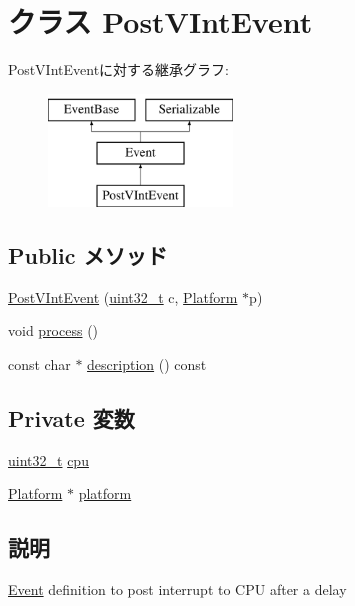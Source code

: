 \hypertarget{classVGic_1_1PostVIntEvent}{
\section{クラス PostVIntEvent}
\label{classVGic_1_1PostVIntEvent}
}
PostVIntEventに対する継承グラフ:\begin{figure}[H]
\begin{center}
\leavevmode
\includegraphics[height=3cm]{classVGic_1_1PostVIntEvent}
\end{center}
\end{figure}
\subsection*{Public メソッド}
\begin{DoxyCompactItemize}
\item 
\hyperlink{classVGic_1_1PostVIntEvent_a570dbdb580e7d62ba8a6ffcedad55aac}{PostVIntEvent} (\hyperlink{Type_8hh_a435d1572bf3f880d55459d9805097f62}{uint32\_\-t} c, \hyperlink{classPlatform}{Platform} $\ast$p)
\item 
void \hyperlink{classVGic_1_1PostVIntEvent_a2e9c5136d19b1a95fc427e0852deab5c}{process} ()
\item 
const char $\ast$ \hyperlink{classVGic_1_1PostVIntEvent_a2bd90422eece9190794479e08092a252}{description} () const 
\end{DoxyCompactItemize}
\subsection*{Private 変数}
\begin{DoxyCompactItemize}
\item 
\hyperlink{Type_8hh_a435d1572bf3f880d55459d9805097f62}{uint32\_\-t} \hyperlink{classVGic_1_1PostVIntEvent_a5af5cfc775318915ba91bd706254f4db}{cpu}
\item 
\hyperlink{classPlatform}{Platform} $\ast$ \hyperlink{classVGic_1_1PostVIntEvent_a75b48f1787959a4617f2a599d7c09aab}{platform}
\end{DoxyCompactItemize}


\subsection{説明}
\hyperlink{classEvent}{Event} definition to post interrupt to CPU after a delay 

